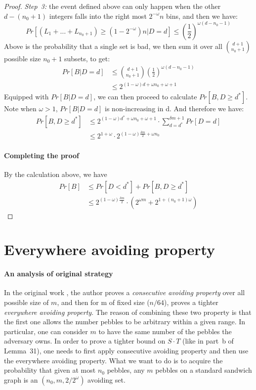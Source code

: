 \documentclass[a4paper, oneside]{article}
\begin{document}
\begin{proof}
  \textit{Step~3:} the event defined above can only happen when the other $d - (n_0 + 1)$ integers falls into the right most $2^{-\omega}n$ bins, and then
  we have:
  \begin{equation}
    Pr[(L_1 + \dots + L_{n_0+1}) \geq (1-2^{-\omega})n|D = d] \leq (\frac{1}{2})^{\omega(d-n_0-1)}
  \end{equation}
  Above is the probability that a single set is bad, we then sum it over all $\binom{d+1}{n_0+1}$ possible size $n_0 + 1$ subsets, to get:
  \begin{align}
    Pr[B|D = d] &\leq \binom{d+1}{n_0+1}(\frac{1}{2})^{\omega(d-n_0-1)} \\
    &\leq 2^{(1-\omega)d + \omega n_0 + \omega + 1}
  \end{align}
  Equipped with $Pr[B|D = d]$, we can then proceed to calculate $Pr[B, D \geq d^*]$. Note when $\omega > 1$, $Pr[B|D = d]$ is non-increasing
  in d. And therefore we have:
  \begin{align}
    Pr[B, D \geq d^*] &\leq 2^{(1-\omega)d^* + \omega n_0 + \omega + 1} \cdot \sum_{d = d^*}^{\delta m + 1}{Pr[D = d]} \\
    &\leq 2^{1+\omega} \cdot 2^{(1-\omega)\frac{\delta m}{2} + \omega n_0}
  \end{align}

  \paragraph{Completing the proof}
  By the calculation above, we have
  \begin{align}
    Pr[B] &\leq Pr[D < d^*] + Pr[B, D \geq d^*] \\
    &\leq 2^{(1-\omega)\frac{\delta m}{2}} \cdot (2^{\omega m} + 2^{1+(n_0+1)\omega})
  \end{align}
\end{proof}

\section{Everywhere avoiding property}
\paragraph{An analysis of original strategy}
In the original work \cite{corrigan2016balloon}, the author proves a \textit{consecutive avoiding property} over all possible size of $m$, and
then for m of fixed size ($n/64$), proves a tighter \textit{everywhere avoiding property}. The reason of combining these two property is that
the first one allows the number pebbles to be arbitrary within a given range. In particular, one can consider $m$ to have the same number of the
pebbles the adversary owns. In order to prove a tighter bound on $S \cdot T$ (like in part~b of Lemma~31), one needs to first apply consecutive
avoiding property and then use the everywhere avoiding property. What we want to do is to acquire the probability that given at most $n_0$ pebbles,
any $m$ pebbles on a standard sandwich graph is an $(n_0, m, 2/2^\omega)$ avoiding set.
\end{document}
